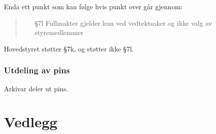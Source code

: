 \documentclass[10pt,norsk,a4paper]{article}
\begin{document}
\begin{minipage}[t]{0.49\textwidth}
Enda ett punkt som kan følge hvis punkt over går gjennom:

\begin{quote}
    \begin{enumerate}
        \item[§7l] Fullmakter gjelder kun ved vedtektsaker og ikke valg av styremedlemmer
    \end{enumerate}
\end{quote}

Hovedstyret støtter §7k, og støtter ikke §7l.

\end{minipage}

\newpage

\section{Utdeling av pins}

Arkivar deler ut pins.


\part*{Vedlegg}\label{lastpage}

\newpage
{}

\end{document}
